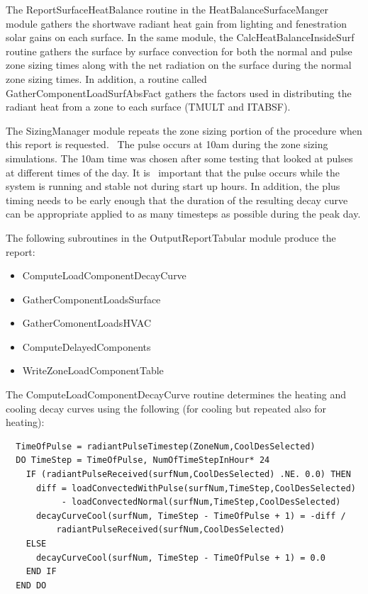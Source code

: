 The ReportSurfaceHeatBalance routine in the HeatBalanceSurfaceManger module gathers the shortwave radiant heat gain from lighting and fenestration solar gains on each surface. In the same module, the CalcHeatBalanceInsideSurf routine gathers the surface by surface convection for both the normal and pulse zone sizing times along with the net radiation on the surface during the normal zone sizing times. In addition, a routine called GatherComponentLoadSurfAbsFact gathers the factors used in distributing the radiant heat from a zone to each surface (TMULT and ITABSF).

The SizingManager module repeats the zone sizing portion of the procedure when this report is requested.~ The pulse occurs at 10am during the zone sizing simulations. The 10am time was chosen after some testing that looked at pulses at different times of the day. It is ~important that the pulse occurs while the system is running and stable not during start up hours. In addition, the plus timing needs to be early enough that the duration of the resulting decay curve can be appropriate applied to as many timesteps as possible during the peak day.

The following subroutines in the OutputReportTabular module produce the report:

\begin{itemize}
\item
  ComputeLoadComponentDecayCurve
\item
  GatherComponentLoadsSurface
\item
  GatherComonentLoadsHVAC
\item
  ComputeDelayedComponents
\item
  WriteZoneLoadComponentTable
\end{itemize}

The ComputeLoadComponentDecayCurve routine determines the heating and cooling decay curves using the following (for cooling but repeated also for heating):

\begin{lstlisting}
  TimeOfPulse = radiantPulseTimestep(ZoneNum,CoolDesSelected)
  DO TimeStep = TimeOfPulse, NumOfTimeStepInHour* 24
    IF (radiantPulseReceived(surfNum,CoolDesSelected) .NE. 0.0) THEN
      diff = loadConvectedWithPulse(surfNum,TimeStep,CoolDesSelected)
           - loadConvectedNormal(surfNum,TimeStep,CoolDesSelected)
      decayCurveCool(surfNum, TimeStep - TimeOfPulse + 1) = -diff /
          radiantPulseReceived(surfNum,CoolDesSelected)
    ELSE
      decayCurveCool(surfNum, TimeStep - TimeOfPulse + 1) = 0.0
    END IF
  END DO
\end{lstlisting}

